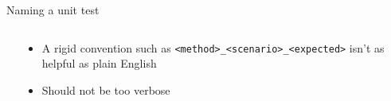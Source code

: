 \documentclass[english,10pt,aspectratio=169,t]{beamer}
\begin{document}
\begin{frame}{Naming a unit test}
  \begin{columns}[T]
    \begin{column}[]{0.55\textwidth}
      \begin{minipage}{\linewidth}
        \rigidname
        \verbosename
        \concisename
      \end{minipage}
    \end{column}
    \begin{column}[]{0.45\textwidth}
      \begin{itemize}
        \item A rigid convention such as \texttt{<method>\_<scenario>\_<expected>}
        isn't as helpful as plain English
        \item Should not be too verbose
      \end{itemize}
    \end{column}
  \end{columns}
\end{frame}
\end{document}
